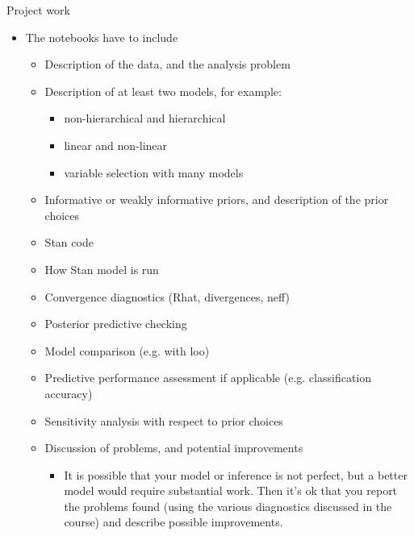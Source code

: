 \documentclass[t]{beamer}
\begin{document}
\begin{frame}
  
  {\Large\color{navyblue} Project work}
  
  \begin{itemize}
  \item The notebooks have to include
    \begin{itemize}
    \item Description of the data, and the analysis problem
    \item Description of at least two models, for example:
      \begin{itemize}
      \item non-hierarchical and hierarchical
      \item linear and non-linear
      \item variable selection with many models
    \end{itemize}
    \item Informative or weakly informative priors, and description of the prior choices
    \item Stan code
    \item How Stan model is run
    \item Convergence diagnostics (Rhat, divergences, neff)
    \item Posterior predictive checking
    \item Model comparison (e.g. with loo)
    \item Predictive performance assessment if applicable (e.g. classification
      accuracy)
    \item Sensitivity analysis with respect to prior choices
    \item Discussion of problems, and potential improvements 
      \begin{itemize}
      \item It is possible that your model or inference is not perfect, but a better model would require substantial work. Then it's ok that you report the problems found (using the various diagnostics discussed in the course) and describe possible improvements.
      \end{itemize}
    \end{itemize}
  \end{itemize}
\end{frame}
\end{document}
